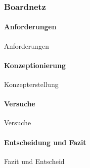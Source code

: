 \documentclass[main.tex]{subfiles} %
\begin{document}

\subsubsection{Boardnetz}

\paragraph{Anforderungen}
Anforderungen

\paragraph{Konzeptionierung}
Konzepterstellung

\paragraph{Versuche}
Versuche

\paragraph{Entscheidung und Fazit}
Fazit und Entscheid
\end{document}
